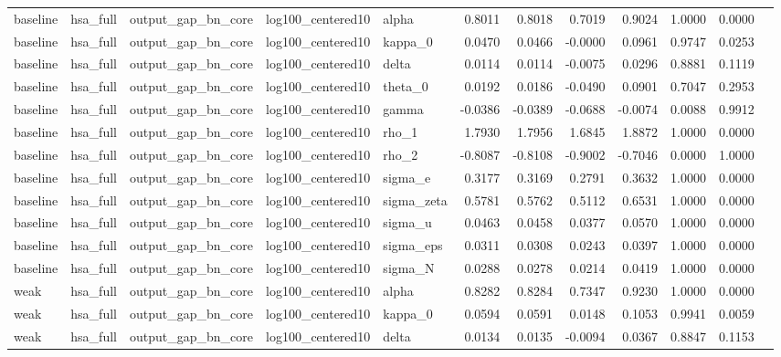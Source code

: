 \begin{tabular}{lllllrrrrrrl}
baseline & hsa\_full & output\_gap\_bn\_core & log100\_centered10 & alpha & 0.8011 & 0.8018 & 0.7019 & 0.9024 & 1.0000 & 0.0000 &  \\
baseline & hsa\_full & output\_gap\_bn\_core & log100\_centered10 & kappa\_0 & 0.0470 & 0.0466 & -0.0000 & 0.0961 & 0.9747 & 0.0253 &  \\
baseline & hsa\_full & output\_gap\_bn\_core & log100\_centered10 & delta & 0.0114 & 0.0114 & -0.0075 & 0.0296 & 0.8881 & 0.1119 &  \\
baseline & hsa\_full & output\_gap\_bn\_core & log100\_centered10 & theta\_0 & 0.0192 & 0.0186 & -0.0490 & 0.0901 & 0.7047 & 0.2953 &  \\
baseline & hsa\_full & output\_gap\_bn\_core & log100\_centered10 & gamma & -0.0386 & -0.0389 & -0.0688 & -0.0074 & 0.0088 & 0.9912 &  \\
baseline & hsa\_full & output\_gap\_bn\_core & log100\_centered10 & rho\_1 & 1.7930 & 1.7956 & 1.6845 & 1.8872 & 1.0000 & 0.0000 &  \\
baseline & hsa\_full & output\_gap\_bn\_core & log100\_centered10 & rho\_2 & -0.8087 & -0.8108 & -0.9002 & -0.7046 & 0.0000 & 1.0000 &  \\
baseline & hsa\_full & output\_gap\_bn\_core & log100\_centered10 & sigma\_e & 0.3177 & 0.3169 & 0.2791 & 0.3632 & 1.0000 & 0.0000 &  \\
baseline & hsa\_full & output\_gap\_bn\_core & log100\_centered10 & sigma\_zeta & 0.5781 & 0.5762 & 0.5112 & 0.6531 & 1.0000 & 0.0000 &  \\
baseline & hsa\_full & output\_gap\_bn\_core & log100\_centered10 & sigma\_u & 0.0463 & 0.0458 & 0.0377 & 0.0570 & 1.0000 & 0.0000 &  \\
baseline & hsa\_full & output\_gap\_bn\_core & log100\_centered10 & sigma\_eps & 0.0311 & 0.0308 & 0.0243 & 0.0397 & 1.0000 & 0.0000 &  \\
baseline & hsa\_full & output\_gap\_bn\_core & log100\_centered10 & sigma\_N & 0.0288 & 0.0278 & 0.0214 & 0.0419 & 1.0000 & 0.0000 &  \\
weak & hsa\_full & output\_gap\_bn\_core & log100\_centered10 & alpha & 0.8282 & 0.8284 & 0.7347 & 0.9230 & 1.0000 & 0.0000 &  \\
weak & hsa\_full & output\_gap\_bn\_core & log100\_centered10 & kappa\_0 & 0.0594 & 0.0591 & 0.0148 & 0.1053 & 0.9941 & 0.0059 &  \\
weak & hsa\_full & output\_gap\_bn\_core & log100\_centered10 & delta & 0.0134 & 0.0135 & -0.0094 & 0.0367 & 0.8847 & 0.1153 &  \\

\end{tabular}
